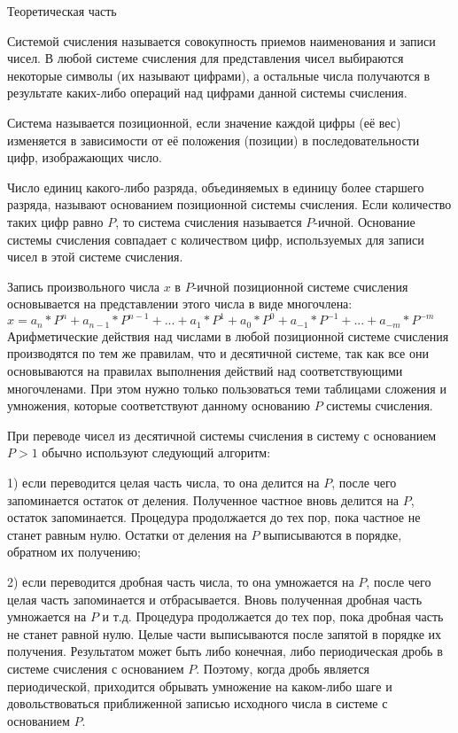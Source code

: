 \begin{center}
    Теоретическая часть
\end{center}

Системой счисления называется совокупность приемов наименования и записи чисел. В любой системе счисления для представления чисел выбираются некоторые символы (их называют цифрами), а остальные числа получаются в результате каких-либо операций над цифрами данной системы счисления.

Система называется позиционной, если значение каждой цифры (её вес) изменяется в зависимости от её положения (позиции) в последовательности цифр, изображающих число.

Число единиц какого-либо разряда, объединяемых в единицу более старшего разряда, называют основанием позиционной системы счисления. Если количество таких цифр равно $P$, то система счисления называется $P$-ичной. Основание системы счисления совпадает с количеством цифр, используемых для записи чисел в этой системе счисления.

Запись произвольного числа $x$ в $P$-ичной позиционной системе счисления основывается на представлении этого числа в виде многочлена:
\\

$
x = a_n * P^n +
a_{n-1} * P^{n-1} +
... +
a_1 * P^1 +
a_0 * P^0 +
a_{-1} * P^{-1} +
... +
a_{-m} * P^{-m}
$
\\

Арифметические действия над числами в любой позиционной системе счисления производятся по тем же правилам, что и десятичной системе, так как все они основываются на правилах выполнения действий над соответствующими многочленами. При этом нужно только пользоваться теми таблицами сложения и умножения, которые соответствуют данному основанию $P$ системы счисления.

При переводе чисел из десятичной системы счисления в систему с основанием $P > 1$ обычно используют следующий алгоритм:

1) если переводится целая часть числа, то она делится на $P$, после чего запоминается остаток от деления. Полученное частное вновь делится на $P$, остаток запоминается. Процедура продолжается до тех пор, пока частное не станет равным нулю. Остатки от деления на $P$ выписываются в порядке, обратном их получению;

2) если переводится дробная часть числа, то она умножается на $P$, после чего целая часть запоминается и отбрасывается. Вновь полученная дробная часть умножается на $P$ и т.д. Процедура продолжается до тех пор, пока дробная часть не станет равной нулю. Целые части выписываются после запятой в порядке их получения. Результатом может быть либо конечная, либо периодическая дробь в системе счисления с основанием $P$. Поэтому, когда дробь является периодической, приходится обрывать умножение на каком-либо шаге и довольствоваться приближенной записью исходного числа в системе с основанием $P$.
\clearpage
